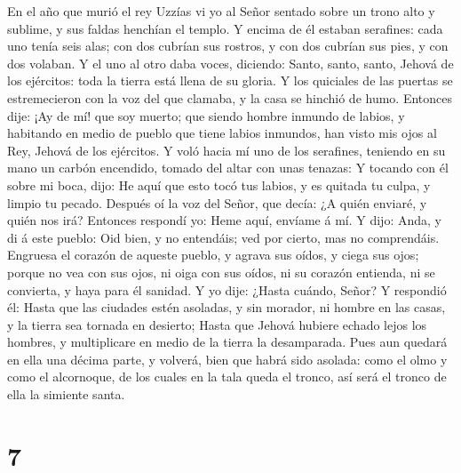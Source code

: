  En el año que murió el rey Uzzías vi yo al Señor sentado
sobre un trono alto y sublime, y sus faldas henchían el templo.
 Y encima de él estaban serafines: cada uno tenía seis alas;
con dos cubrían sus rostros, y con dos cubrían sus pies, y con dos
volaban.  Y el uno al otro daba voces, diciendo: Santo,
santo, santo, Jehová de los ejércitos: toda la tierra está llena de su
gloria.  Y los quiciales de las puertas se estremecieron con
la voz del que clamaba, y la casa se hinchió de humo. 
Entonces dije: ¡Ay de mí! que soy muerto; que siendo hombre inmundo de
labios, y habitando en medio de pueblo que tiene labios inmundos, han
visto mis ojos al Rey, Jehová de los ejércitos.  Y voló
hacia mí uno de los serafines, teniendo en su mano un carbón encendido,
tomado del altar con unas tenazas:  Y tocando con él sobre
mi boca, dijo: He aquí que esto tocó tus labios, y es quitada tu culpa,
y limpio tu pecado.  Después oí la voz del Señor, que decía:
¿A quién enviaré, y quién nos irá? Entonces respondí yo: Heme aquí,
envíame á mí.  Y dijo: Anda, y di á este pueblo: Oid bien, y
no entendáis; ved por cierto, mas no comprendáis.  Engruesa
el corazón de aqueste pueblo, y agrava sus oídos, y ciega sus ojos;
porque no vea con sus ojos, ni oiga con sus oídos, ni su corazón
entienda, ni se convierta, y haya para él sanidad.  Y yo
dije: ¿Hasta cuándo, Señor? Y respondió él: Hasta que las ciudades estén
asoladas, y sin morador, ni hombre en las casas, y la tierra sea tornada
en desierto;  Hasta que Jehová hubiere echado lejos los
hombres, y multiplicare en medio de la tierra la desamparada.
 Pues aun quedará en ella una décima parte, y volverá, bien
que habrá sido asolada: como el olmo y como el alcornoque, de los cuales
en la tala queda el tronco, así será el tronco de ella la simiente
santa.

\hypertarget{section-6}{%
\section{7}\label{section-6}}

